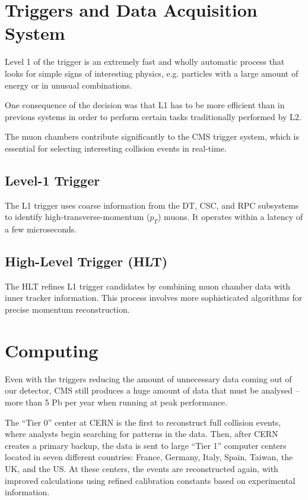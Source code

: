 \section{Triggers and Data Acquisition System}

Level 1 of the trigger is an extremely fast and wholly automatic process that looks for simple signs of interesting physics, e.g. particles with a large amount of energy or in unusual combinations.

One consequence of the decision was that L1 has to be more efficient than in previous systems in order to perform certain tasks traditionally performed by L2.

The muon chambers contribute significantly to the CMS trigger system, which is essential for selecting interesting collision events in real-time.

\subsection{Level-1 Trigger}
The L1 trigger uses coarse information from the DT, CSC, and RPC subsystems to identify high-transverse-momentum ($p_T$) muons. It operates within a latency of a few microseconds.

\subsection{High-Level Trigger (HLT)}
The HLT refines L1 trigger candidates by combining muon chamber data with inner tracker information. This process involves more sophisticated algorithms for precise momentum reconstruction.




\section{Computing}

Even with the triggers reducing the amount of unnecessary data coming out of our detector, CMS still produces a huge amount of data that must be analysed -- more than 5 Pb per year when running at peak performance.

The ``Tier 0'' center at CERN is the first to reconstruct full collision events, where analysts begin searching for patterns in the data. 
Then, after CERN creates a primary backup, the data is sent to large ``Tier 1'' computer centers located in seven different countries: France, Germany, Italy, Spain, Taiwan, the UK, and the US. 
At these centers, the events are reconstructed again, with improved calculations using refined calibration constants based on experimental information.

